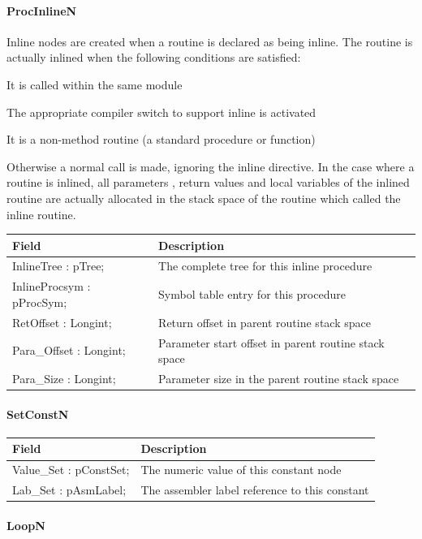 \documentclass [a4paper,12pt]{article}
\begin{document}
\paragraph{ProcInlineN}\mbox{}

Inline nodes are created when a routine is declared as being inline. The
routine is actually inlined when the following conditions are satisfied:

It is called within the same module

The appropriate compiler switch to support inline is activated

It is a non-method routine (a standard procedure or function)

Otherwise a normal call is made, ignoring the inline directive. In the case
where a routine is inlined, all parameters , return values and local
variables of the inlined routine are actually allocated in the stack space
of the routine which called the inline routine.

\begin{longtable}{|l|p{10cm}|}
\hline
Field	& Description \\
\hline
\endhead
\hline
\endfoot
\textsf{InlineTree : pTree;}&
	The complete tree for this inline procedure \\
\textsf{InlineProcsym : pProcSym;}&
	Symbol table entry for this procedure \\
\textsf{RetOffset : Longint;}&
	Return offset in parent routine stack space \\
\textsf{Para{\_}Offset : Longint;}&
	Parameter start offset in parent routine stack space \\
\textsf{Para{\_}Size : Longint;}&
	Parameter size in the parent routine stack space
\label{tab26}
\end{longtable}

\paragraph{SetConstN}\mbox{}

\begin{longtable}{|l|p{10cm}|}
\hline
Field	& Description \\
\hline
\endhead
\hline
\endfoot
\textsf{Value{\_}Set : pConstSet;}& The numeric value of this constant node \\
\textsf{Lab{\_}Set : pAsmLabel;}  & The assembler label reference to this constant
\label{tab27}
\end{longtable}

\paragraph{LoopN}\mbox{}
\end{document}
